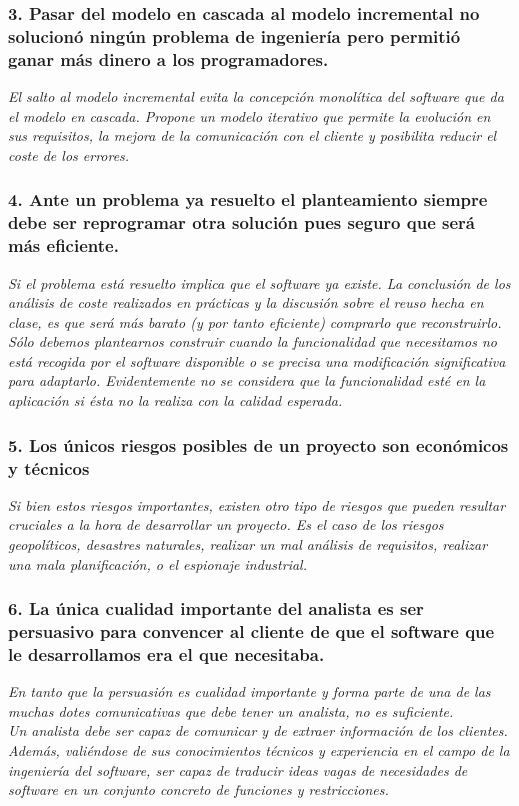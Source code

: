 \subsubsection*{3. Pasar del modelo en cascada al modelo incremental no solucionó ningún problema de ingeniería pero permitió ganar más dinero a los programadores.}
\textit{El salto al modelo incremental evita la concepción monolítica del software que da el modelo en cascada. Propone un modelo iterativo que permite la evolución en sus requisitos, la mejora de la comunicación con el cliente y posibilita reducir el coste de los errores.}

\subsubsection*{4. Ante un problema ya resuelto el planteamiento siempre debe ser reprogramar otra solución pues seguro que será más eficiente.}
\textit{Si el problema está resuelto implica que el software ya existe. La conclusión de los análisis de coste realizados en prácticas y la discusión sobre el reuso hecha en clase, es que será más barato (y por tanto eficiente) comprarlo que reconstruirlo. Sólo debemos plantearnos construir cuando la funcionalidad que necesitamos no está recogida por el software disponible o se precisa una modificación significativa para adaptarlo. Evidentemente no se considera que la funcionalidad esté en la aplicación si ésta no la realiza con la calidad esperada.}

\subsubsection*{5. Los únicos riesgos posibles de un proyecto son económicos y técnicos}
\textit{Si bien estos riesgos importantes, existen otro tipo de riesgos que pueden resultar cruciales a la hora de desarrollar un proyecto. Es el caso de los riesgos geopolíticos, desastres naturales, realizar un mal análisis de requisitos, realizar una mala planificación, o el espionaje industrial.}

\subsubsection*{6. La única cualidad importante del analista es ser persuasivo para convencer al cliente de que el software que le desarrollamos era el que necesitaba.}
\textit{En tanto que la persuasión es cualidad importante y forma parte de una de las muchas dotes comunicativas que debe tener un analista, no es suficiente.
    \\
    Un analista debe ser capaz de comunicar y de extraer información de los clientes.\\
    Además, valiéndose de sus conocimientos técnicos y experiencia en el campo de la ingeniería del software, ser capaz de traducir ideas vagas de necesidades de software en un conjunto concreto de funciones y restricciones.
}

